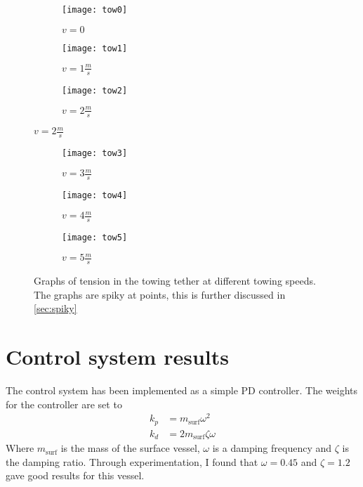 \begin{figure}
	\centering
	\begin{subfigure}[b]{0.7\textwidth}
		\centering
		\texttt{[image: tow0]}
		\caption{\(v=0\)}
	\end{subfigure}
	\hfill
	\begin{subfigure}[b]{0.7\textwidth}
		\centering
		\texttt{[image: tow1]}
		\caption{\(v=1\frac{m}{s}\)}
	\end{subfigure}
	\hfill
	\begin{subfigure}[b]{0.7\textwidth}
		\centering
		\texttt{[image: tow2]}
		\caption{\(v=2\frac{m}{s}\)}
	\end{subfigure}
\end{figure}

\begin{figure}\ContinuedFloat
	\centering
	\begin{subfigure}[b]{0.7\textwidth}
		\centering
		\texttt{[image: tow3]}
		\caption{\(v=3\frac{m}{s}\)}
	\end{subfigure}
	\hfill
	\begin{subfigure}[b]{0.7\textwidth}
		\centering
		\texttt{[image: tow4]}
		\caption{\(v=4\frac{m}{s}\)}
	\end{subfigure}
	\hfill
	\begin{subfigure}[b]{0.7\textwidth}
		\centering
		\texttt{[image: tow5]}
		\caption{\(v=5\frac{m}{s}\)}
	\end{subfigure}
	\caption{Graphs of tension in the towing tether at different towing speeds. The graphs are spiky at points, this is further discussed in \cref{sec:spiky}}
	\label{fig:tensions}
\end{figure}

\section{Control system results}
The control system has been implemented as a simple PD controller. The weights for the controller are set to 
\begin{align*}
k_p &= m_{\text{surf}}\omega^2 \\
k_d &= 2m_{\text{surf}}\zeta\omega
\end{align*}
Where \(m_{\text{surf}}\) is the mass of the surface vessel, \(\omega\) is a damping frequency and \(\zeta\) is the damping ratio. Through experimentation, I found that \(\omega = 0.45\) and \(\zeta = 1.2\) gave good results for this vessel. 

